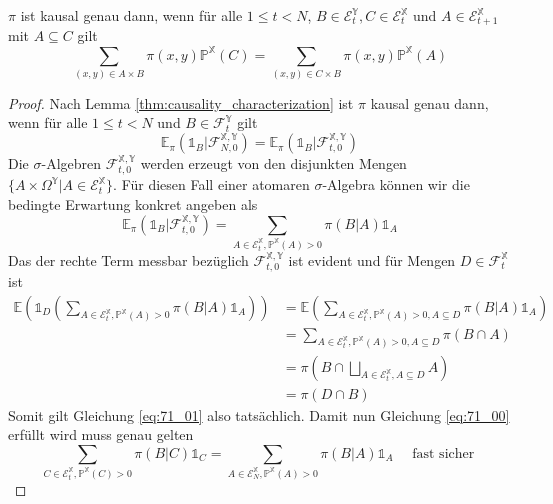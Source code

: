 \begin{lemma}\label{thm:causality_finite_case}
    $\pi$ ist kausal genau dann, wenn für alle $1\leq t < N$, $B \in \mathcal{E}_t^\mathbb{Y}, C \in \mathcal{E}_t^\mathbb{X}$ und $A \in \mathcal{E}_{t+1}^\mathbb{X}$ mit $A \subseteq C$ gilt
    $$\sum_{(x,y) \in A\times B} \pi(x,y)\mathbb{P}^\mathbb{X}(C) = \sum_{(x,y) \in C\times B} \pi(x,y) \mathbb{P}^\mathbb{X}(A)$$
\end{lemma}
\begin{proof}
Nach Lemma \ref{thm:causality_characterization} ist $\pi$ kausal genau dann, wenn für alle $1\leq t < N$ und $B \in \mathcal{F}_t^\mathbb{Y}$ gilt 
\begin{equation}\label{eq:71_00}
    \mathbb{E}_\pi(\mathds{1}_B \vert \mathcal{F}_{N,0}^{\mathbb{X,Y}}) = \mathbb{E}_\pi(\mathds{1}_B \vert \mathcal{F}_{t,0}^{\mathbb{X,Y}})
\end{equation}
Die $\sigma$-Algebren $\mathcal{F}_{t,0}^{\mathbb{X,Y}}$ werden erzeugt von den disjunkten Mengen $\{A\times \Omega^\mathbb{Y} \vert A \in \mathcal{E}_t^\mathbb{X}\}$. Für diesen Fall einer atomaren $\sigma$-Algebra können wir die bedingte Erwartung konkret angeben als
\begin{equation}\label{eq:71_01}
    \mathbb{E}_\pi(\mathds{1}_B \vert \mathcal{F}_{t,0}^{\mathbb{X,Y}}) = \sum_{A \in \mathcal{E}_t^\mathbb{X}, \mathbb{P}^\mathbb{X}(A)>0} \pi(B \vert A) \mathds{1}_{A}
\end{equation}
Das der rechte Term messbar bezüglich $\mathcal{F}_{t,0}^{\mathbb{X,Y}}$ ist evident und für Mengen $D \in \mathcal{F}_t^\mathbb{X}$ ist 
\begin{align*}
    \mathbb{E}\left( \mathds{1}_D\left( \sum_{A \in \mathcal{E}_t^\mathbb{X}, \mathbb{P}^\mathbb{X}(A)>0} \pi(B \vert A) \mathds{1}_{A}\right)\right) &= \mathbb{E}\left( \sum_{A \in \mathcal{E}_t^\mathbb{X}, \mathbb{P}^\mathbb{X}(A)>0, A\subseteq D} \pi(B \vert A) \mathds{1}_{A}\right) \\
    &= \sum_{A \in \mathcal{E}_t^\mathbb{X}, \mathbb{P}^\mathbb{X}(A)>0, A\subseteq D} \pi(B\cap A) \\
    &= \pi\left( B\cap \bigsqcup_{A \in \mathcal{E}_t^\mathbb{X}, A\subseteq D}A\right) \\
    &= \pi(D \cap B)
\end{align*}
Somit gilt Gleichung \ref{eq:71_01} also tatsächlich. Damit nun Gleichung \ref{eq:71_00} erfüllt wird muss genau gelten
$$\sum_{C \in \mathcal{E}_t^\mathbb{X}, \mathbb{P}^\mathbb{X}(C)>0} \pi(B \vert C) \mathds{1}_C = \sum_{A \in \mathcal{E}_N^\mathbb{X}, \mathbb{P}^\mathbb{X}(A)>0} \pi(B \vert A) \mathds{1}_A \quad \text{ fast sicher }$$

\end{proof}
